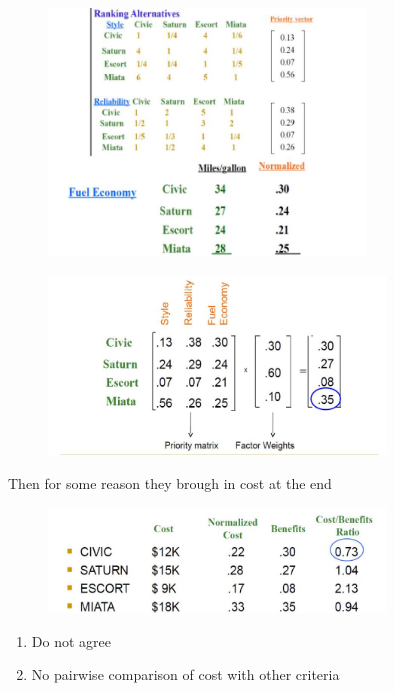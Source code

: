 \documentclass[aspectratio=1610,pdftex,dvipsnames,compress,xcolor={dvipsnames}]{beamer}
\begin{document}
\begin{frame}{}
    \begin{figure}
        \centering
        \includegraphics[width=0.75\textwidth]{ahp_car.rank.jpg}
    \end{figure}
\end{frame}


\begin{frame}{}
    \begin{figure}
        \centering
        \includegraphics[width=0.80\textwidth]{ahp_car.priority.jpg}
    \end{figure}
\end{frame}


\begin{frame}{Then for some reason they brough in cost at the end}
    \begin{figure}
        \centering
        \includegraphics[width=0.80\textwidth]{ahp_cost.jpg}
    \end{figure}

    \begin{enumerate}[series=outerlist,topsep=0pt,itemsep=21pt,leftmargin=*,label=(\arabic*)]
        \item[]Do not agree
        \item[]No pairwise comparison of cost with other criteria
    \end{enumerate}
\end{frame}
\end{document}
